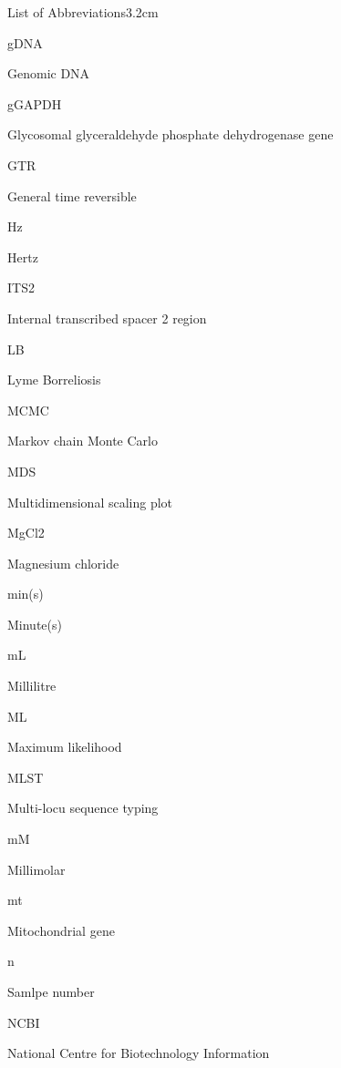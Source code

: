 \documentclass[a4paper, nobind]{templates/ociamthesis}
\begin{document}
\begin{romanpages}
\begin{mclistof}{List of Abbreviations}{3.2cm}
\item[gDNA]

Genomic DNA

\item[gGAPDH]

Glycosomal glyceraldehyde phosphate dehydrogenase gene

\item[GTR]

General time reversible

\item[Hz]

Hertz

\item[ITS2]

Internal transcribed spacer 2 region

\item[LB]

Lyme Borreliosis

\item[MCMC]

Markov chain Monte Carlo

\item[MDS]

Multidimensional scaling plot

\item[MgCl2]

Magnesium chloride

\item[min(s)]

Minute(s)

\item[mL]

Millilitre

\item[ML]

Maximum likelihood

\item[MLST]

Multi-locu sequence typing

\item[mM]

Millimolar

\item[mt]

Mitochondrial gene

\item[n]

Samlpe number

\item[NCBI]

National Centre for Biotechnology Information


\end{mclistof}
\end{romanpages}
\end{document}

